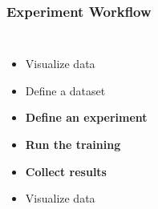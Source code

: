\documentclass[aspectratio=169,11pt,hyperref={colorlinks=true}]{beamer}
\begin{document}
\begin{frame}
    \frametitle{Experiment Workflow}
    \begin{columns}
        \begin{itemize}
            \item{Visualize data}
            \item{Define a dataset}
            \item{\textbf{Define an experiment}}
            \item{\textbf{Run the training}}
            \item{\textbf{Collect results}}
            \item{Visualize data}
        \end{itemize}
          \begin{figure}
            
          \end{figure}
          \begin{figure}
            
          \end{figure}
    \end{columns}
\end{frame}
\end{document}
